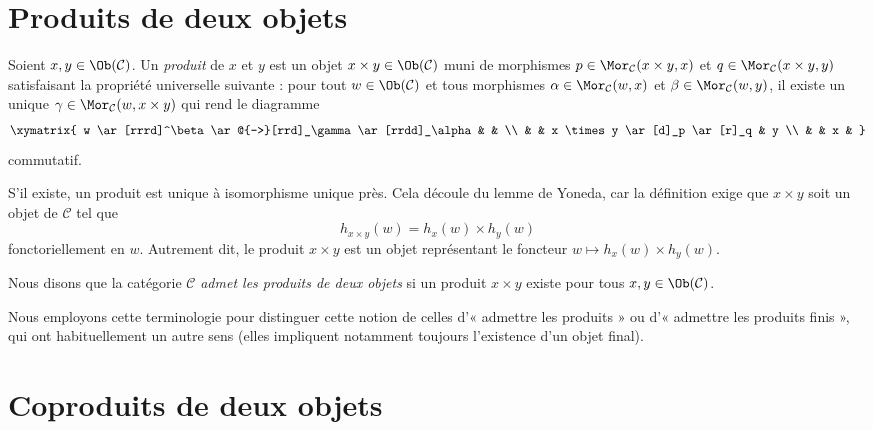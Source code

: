 \section{Produits de deux objets}
\label{section-products-pairs}

\begin{definition}
\label{definition-products}
Soient $x, y\in \Ob(\mathcal{C})$.
Un {\it produit} de $x$ et $y$ est
un objet $x \times y \in \Ob(\mathcal{C})$
muni de morphismes
$p\in \Mor_{\mathcal C}(x \times y, x)$ et
$q\in\Mor_{\mathcal C}(x \times y, y)$
satisfaisant la propriété universelle suivante : pour tout
$w\in \Ob(\mathcal{C})$ et tous morphismes
$\alpha \in \Mor_{\mathcal C}(w, x)$ et
$\beta \in \Mor_\mathcal{C}(w, y)$,
il existe un unique
$\gamma\in \Mor_{\mathcal C}(w, x \times y)$ qui rend le diagramme
$$
\xymatrix{
w \ar[rrrd]^\beta \ar@{-->}[rrd]_\gamma \ar[rrdd]_\alpha & & \\
& & x \times y \ar[d]_p \ar[r]_q & y \\
& & x &
}
$$
commutatif.
\end{definition}

\noindent
S'il existe, un produit est unique à isomorphisme unique près.
Cela découle du lemme de Yoneda, car la définition exige que
$x \times y$ soit un objet de $\mathcal{C}$ tel que
$$
h_{x \times y}(w) = h_x(w) \times h_y(w)
$$
fonctoriellement en $w$. Autrement dit, le produit $x \times y$
est un objet représentant le foncteur
$w \mapsto h_x(w) \times h_y(w)$.

\begin{definition}
\label{definition-has-products-of-pairs}
Nous disons que la catégorie $\mathcal{C}$ {\it admet les produits de deux
objets} si un produit $x \times y$ existe pour tous
$x, y \in \Ob(\mathcal{C})$.
\end{definition}

\noindent
Nous employons cette terminologie pour distinguer cette notion de celles
d'« admettre les produits » ou d'« admettre les produits finis », qui ont
habituellement un autre sens (elles impliquent notamment toujours l'existence
d'un objet final).





\section{Coproduits de deux objets}
\label{section-coproducts-pairs}

